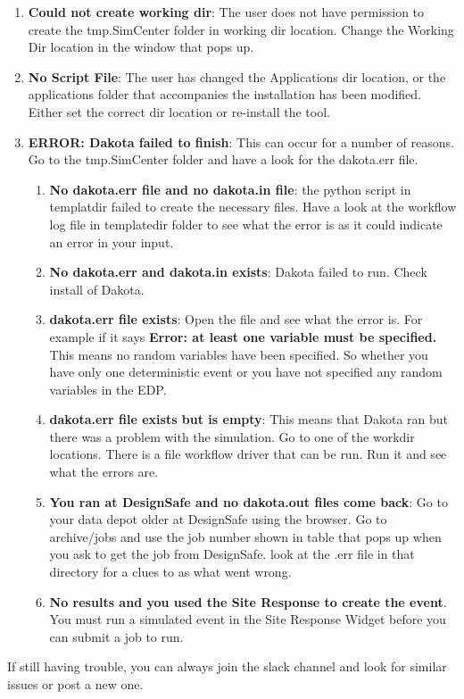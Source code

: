 \begin{enumerate}
\item \textbf{Could not create working dir}: The user does not have permission to create the tmp.SimCenter folder in working dir location. Change the Working Dir location in the window that pops up.
\item \textbf{No Script File}: The user has changed the Applications dir location, or the applications folder that accompanies the installation has been modified. Either set the correct dir location or re-install the tool.
\item \textbf{ERROR: Dakota failed to finish}: This can occur for a number of reasons. Go to the tmp.SimCenter folder and have a look for the dakota.err file.
\begin{enumerate}
\item \textbf{No dakota.err file and no dakota.in file}: the python script in templatdir failed to create the necessary files. Have a look at the workflow log file in templatedir folder to see what the error is as it could indicate an error in your input.
\item \textbf{No dakota.err and dakota.in exists}: Dakota failed to run. Check install of Dakota.
\item \textbf{dakota.err file exists}: Open the file and see what the error is.  For example if it says \textbf{Error: at least one variable must be specified.} This means no random variables have been specified. So whether you have only one  deterministic event or you have not specified any random variables in the EDP.
\item \textbf{dakota.err file exists but is empty}: This means that Dakota ran but there was a problem with the simulation. Go to one of the workdir locations. There is a file workflow driver that can be run. Run it and see what the errors are.
\item \textbf{You ran at DesignSafe and no dakota.out files come back}: Go to your data depot older at DesignSafe using the browser. Go to archive/jobs and use the job number shown in table that pops up when you ask to get the job from DesignSafe. look at the .err file in that directory for a clues to as what went wrong.
\item \textbf{No results and you used the Site Response to create the event}. You must run a simulated event in the Site Response Widget before you can submit a job to run.
\end{enumerate}
\end{enumerate}

If still having trouble, you can always join the \texttt{\getsoftwarename{}} slack channel and look for similar issues or post a new one.

